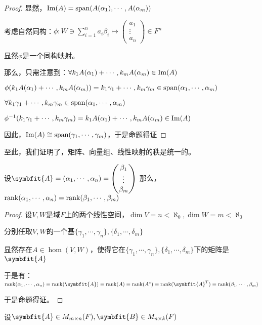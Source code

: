 \documentclass[12pt, a4paper, oneside, UTF8]{ctexbook}
\begin{document}
\begin{para}{0}
\begin{proof}
						显然，$\operatorname{Im}(A)=\operatorname{span}(A(\alpha_1),\cdots,A(\alpha_m))$

						考虑自然同构：$\phi : W \ni \sum\limits_{i=1}^{n} a_i \beta_i \mapsto \begin{pmatrix}
							a_1 \\
							\vdots \\
							a_n
						\end{pmatrix} \in F^n$

						显然$\phi $是一个同构映射。

						那么，只需注意到：$\forall k_1A(\alpha_1)+\cdots,k_mA(\alpha_m)\in \operatorname{Im}(A)$
						
						$\phi (k_1A(\alpha_1)+\cdots,k_mA(\alpha_m))=k_1\gamma_1+\cdots,k_m\gamma_m \in \operatorname{span}(\alpha_1,\cdots,\alpha_m)$

						$\forall k_1\gamma_1+\cdots,k_m\gamma_m \in \operatorname{span}(\alpha_1,\cdots,\alpha_m)$

						$\phi^{-1}(k_1\gamma_1+\cdots,k_m\gamma_m)=k_1A(\alpha_1)+\cdots,k_mA(\alpha_m)\in \operatorname{Im}(A)$

						因此，$\operatorname{Im}(A) \cong \operatorname{span}(\gamma_1,\cdots,\gamma _m)$，于是命题得证
					\end{proof}
					至此，我们证明了，矩阵、向量组、线性映射的秩是统一的。
					\begin{proposition}
						设$\symbfit{A}=(\alpha_1,\cdots,\alpha_n)=\begin{pmatrix}
							\beta_1 \\
							\vdots \\
							\beta_m
						\end{pmatrix}$
						那么，$\operatorname{rank}(\alpha_1,\cdots,\alpha_n)=\operatorname{rank}(\beta_1,\cdots,\beta_m)$
					\end{proposition}
					\begin{proof}
						设$V,W$是域$F$上的两个线性空间，$\dim V = n < \aleph_0,\dim W = m < \aleph_0$

						分别任取$V,W$的一个基$\{\gamma_1,\cdots,\gamma_n\},\{\delta_1,\cdots,\delta_m\}$

						显然存在$A \in \hom(V,W)$，使得它在$\{\gamma_1,\cdots,\gamma_n\},\{\delta_1,\cdots,\delta_m\}$下的矩阵是$\symbfit{A}$

						于是有：$\rank(\alpha_1,\cdots,\alpha_n)=\rank(\symbfit{A})=\rank(A)=\rank(A^*)=\rank(\symbfit{A}^T)=\rank(\beta_1,\cdots,\beta_m)$

						于是命题得证。
					\end{proof}
				\point{}
					\begin{proposition}
						设$\symbfit{A} \in M_{m \times n}(F),\symbfit{B} \in M_{n \times k}(F)$


\end{proposition}
\end{para}
\end{document}
